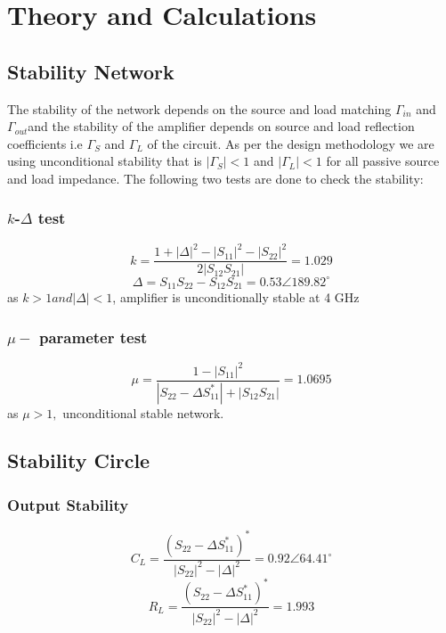 \chapter*{Theory and Calculations} 
\section{ Stability Network } \label{ Stability Network }
\noindent The stability of the network depends on the source and load matching $\Gamma_{in}$ and $\Gamma_{out} $and the stability of the amplifier depends on source and load reflection coefficients i.e $\Gamma_{\textit{S}}$ and $\Gamma_{L}$ of the circuit. As per the design methodology we are using unconditional stability that is $|\Gamma_{S}| < 1$ and $|\Gamma_{L}| < 1$ for all passive source and load impedance. The following two tests are done to check the stability:

\subsection{ \boldmath $k$-$\Delta$ test}
\begin{equation}
k = \frac{1 + {| \Delta | }^{2} - {|S_{11}|}^{2} -  {|S_{22}|}^{2}}{2|S_{12}S_{21}|} = 1.029
\end{equation}
\begin{equation}
\Delta = S_{11}S_{22} - S_{12}S_{21} = 0.53 \angle {189.82}^{\circ}
\end{equation}
\noindent as $k > 1 and |\Delta| < 1$, amplifier is unconditionally stable at 4 GHz

\subsection{ \boldmath $\mu -$ parameter test}
\begin{equation}
\mu = \frac{1 - {|S_{11}|}^{2}}{|S_{22} - \Delta S^{*}_{11}| + |S_{12}S_{21}|}   = 1.0695
\end{equation}
\noindent as $\mu > 1,$ unconditional stable network.

\section{ Stability Circle } \label{ Stability Circle }
\subsection{Output Stability}
\begin{equation}
C_{L} = \frac{(S_{22} - \Delta S^{*}_{11})^{*}}{{|S_{22}|}^{2} - {|\Delta|}^{2}} = 0.92 \angle {64.41}^{\circ}
\end{equation}
\begin{equation}
R_{L} = \frac{(S_{22} - \Delta S^{*}_{11})^{*}}{{|S_{22}|}^{2} - {|\Delta|}^{2}} = 1.993 
\end{equation}
